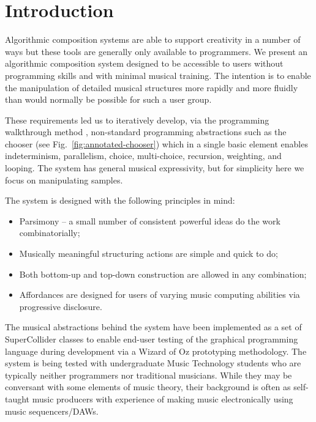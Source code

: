 \documentclass[runningheads,a4paper]{llncs}
\begin{document}
\section{Introduction}\label{introduction}

Algorithmic composition systems are able to support creativity in a number of ways \cite{jacob} but these tools are generally only available to programmers. We present an algorithmic composition system designed to be accessible to users without programming skills and with minimal musical training. The intention is to enable the manipulation of detailed musical structures more rapidly and more fluidly than would normally be possible for such a user group.

These requirements led us to iteratively develop, via the programming walkthrough method \cite{bell}, non-standard programming abstractions such as the chooser (see Fig.~\ref{fig:annotated-chooser}) which in a single basic element enables indeterminism, parallelism, choice, multi-choice, recursion, weighting, and looping. The system has general musical expressivity, but for simplicity here we focus on manipulating samples.

The system is designed with the following principles in mind:

\begin{itemize}
	\item
	Parsimony -- a small number of consistent powerful ideas do the work combinatorially;
	\item
	Musically meaningful structuring actions are simple and quick to do;
	\item
	Both bottom-up and top-down construction are allowed in any combination;
	\item
	Affordances are designed for users of varying music computing abilities via progressive disclosure.
\end{itemize}

The musical abstractions behind the system have been implemented as a set of SuperCollider \cite{supercollider} classes to enable end-user testing of the graphical programming language during development via a Wizard of Oz prototyping methodology. The system is being tested with undergraduate Music Technology students who are typically neither programmers nor traditional musicians. While they may be conversant with some elements of music theory, their background is often as self-taught music producers with experience of making music electronically using music sequencers/DAWs.
\end{document}

